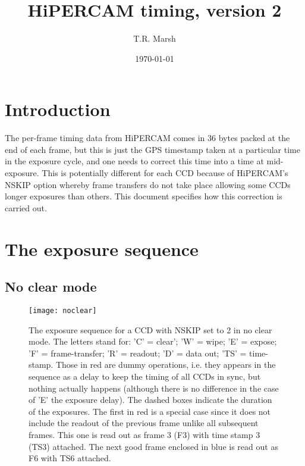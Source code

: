 \documentclass[12pt,a4paper]{article}
\title{HiPERCAM timing, version 2}
\author{T.R. Marsh}
\date{\today}
\begin{document}
\maketitle

\section{Introduction}

The per-frame timing data from HiPERCAM comes in 36 bytes packed at the end of
each frame, but this is just the GPS timestamp taken at a particular time in
the exposure cycle, and one needs to correct this time into a time at
mid-exposure. This is potentially different for each CCD because of HiPERCAM's
NSKIP option whereby frame transfers do not take place allowing some CCDs
longer exposures than others. This document specifies how this correction is
carried out.

\section{The exposure sequence}

\subsection{No clear mode}

\begin{figure}
\begin{center}
\texttt{[image: noclear]}
\end{center}
\caption{\label{noclear} The exposure sequence for a CCD with NSKIP set to 2 in
  no clear mode.  The letters stand for: 'C' = clear'; 'W' = wipe; 'E' =
  expose; 'F' = frame-transfer; 'R' = readout; 'D' = data out; 'TS' =
  time-stamp. Those in red are dummy operations, i.e. they appears in the
  sequence as a delay to keep the timing of all CCDs in sync, but nothing
  actually happens (although there is no difference in the case of 'E' the
  exposure delay). The dashed boxes indicate the duration of the
  exposures. The first in red is a special case since it does not include the
  readout of the previous frame unlike all subsequent frames. This one is read
  out as frame 3 (F3) with time stamp 3 (TS3) attached. The next good frame
  enclosed in blue is read out as F6 with TS6 attached.}
\end{figure}
\end{document}
